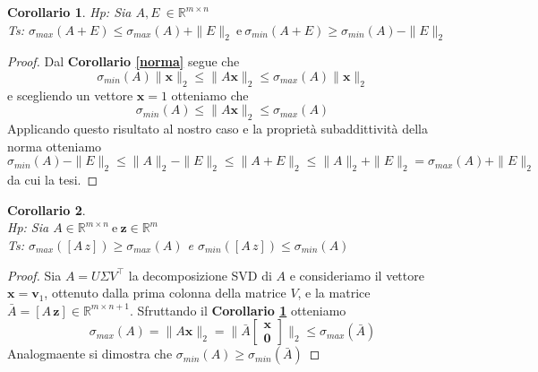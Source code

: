 \documentclass[11pt]{article}
\newtheorem{corollary}{Corollario}
\newcommand{\R}{\mathbb{R}}
\begin{document}
\begin{corollary}\label{sum matr}
\textit{Hp:} Sia $A,E \ \in \R^{m \times n}$\\
\textit{Ts:} $\sigma_{max}(A+E) \leq \sigma_{max}(A) + \|E\|_2 \ \text{e} \ \sigma_{min}(A+E) \geq \sigma_{min}(A) - \|E\|_2$ 
\end{corollary}
\begin{proof}
Dal \textbf{Corollario \ref{norma}}  segue che $$\sigma_{min}(A)\|\mathbf{x}\|_2 \leq \|A\mathbf{x}\|_2 \leq \sigma_{max}(A)\|\mathbf{x}\|_2$$
e scegliendo un vettore $\mathbf{x}=1$ otteniamo che
\[
\sigma_{min}(A) \leq \|A\mathbf{x}\|_2 \leq \sigma_{max}(A)
\]
Applicando questo risultato al nostro caso e la proprietà subaddittività della norma otteniamo
$$ \sigma_{min}(A) - \|E\|_2 \leq \|A\|_2 - \|E\|_2 \leq \|A+E\|_2 \leq \|A\|_2 + \|E\|_2 = \sigma_{max}(A) + \|E\|_2  $$
da cui la tesi. 
\end{proof}

\begin{corollary}\label{add col}
\textbf{}\\
\textit{Hp:} Sia $A \in \R^{m \times n} \ \text{e} \ \mathbf{z}\in \R^m$\\
\textit{Ts:} $\sigma_{max}([A \, z]) \geq \sigma_{max}(A)$ e $\sigma_{min}([A \, z]) \leq \sigma_{min}(A)$
\end{corollary}
\begin{proof}
Sia $A=U\Sigma V^\top      $ la decomposizione SVD di $A$ e consideriamo il vettore $\mathbf{x}= \mathbf{v}_1$, ottenuto dalla prima colonna della matrice $V$, e la matrice $\bar{A} = [A \, \mathbf{z}] \in \R^{m \times n+1}$. Sfruttando il \textbf{Corollario \ref{sum matr}} otteniamo
\[
\sigma_{max}(A)=\| A \mathbf{x} \|_2=\|\bar{A} \mathbf{\begin{bmatrix} x \\0 \end{bmatrix}}  \|_2 \leq \sigma_{max}(\bar{A})
\]
Analogmaente si dimostra che $\sigma_{min}(A) \geq \sigma_{min}(\bar{A}) $
\end{proof}
\noindent
\end{document}

